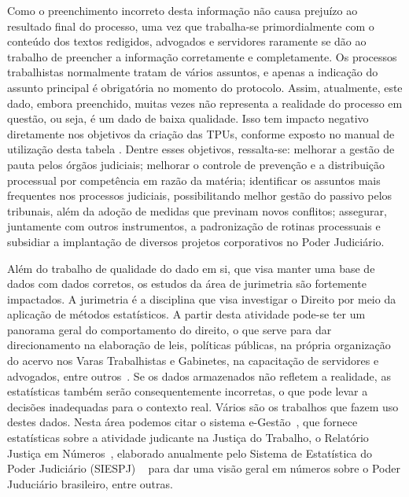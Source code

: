 Como o preenchimento incorreto desta informação não causa prejuízo ao resultado final do processo, uma vez que trabalha-se primordialmente com o conteúdo dos textos redigidos, advogados e servidores raramente se dão ao trabalho de preencher a informação corretamente e completamente. Os processos trabalhistas normalmente tratam de vários assuntos, e apenas a indicação do assunto principal é obrigatória no momento do protocolo. Assim, atualmente, este dado, embora preenchido, muitas vezes não representa a realidade do processo em questão, ou seja, é um dado de baixa qualidade. Isso tem impacto negativo diretamente nos objetivos da criação das TPUs, conforme exposto no manual de utilização desta tabela \cite{manualtpucnj}. Dentre esses objetivos, ressalta-se: melhorar a gestão de pauta pelos órgãos judiciais; melhorar o controle de prevenção e a distribuição processual por competência em razão da matéria; identificar os assuntos mais frequentes nos processos judiciais, possibilitando melhor gestão do passivo pelos tribunais, além da adoção de medidas que previnam novos conflitos; assegurar, juntamente com outros instrumentos, a padronização de rotinas processuais e subsidiar a implantação de diversos projetos corporativos no Poder Judiciário.

Além do trabalho de qualidade do dado em si, que visa manter uma base de dados com dados corretos, os estudos da área de jurimetria são fortemente impactados. A jurimetria é a disciplina que visa investigar o Direito por meio da aplicação de métodos estatísticos. 
A partir desta atividade pode-se ter um panorama geral do comportamento do direito, o que serve para dar direcionamento na elaboração de leis, políticas públicas, na própria organização do acervo nos Varas Trabalhistas e Gabinetes, na capacitação de servidores e advogados, entre outros~\cite{jurimetriaingles,jurimetriaportugues}. Se os dados armazenados não refletem a realidade, as estatísticas também serão consequentemente incorretas, o que pode levar a decisões inadequadas para o contexto real. Vários são os trabalhos que fazem uso destes dados. Nesta área podemos citar o sistema e-Gestão~\cite{leiegestao}, que fornece estatísticas sobre a atividade judicante na Justiça do Trabalho,  o Relatório Justiça em Números~\cite{leijusticaemnumeros}, elaborado anualmente pelo Sistema de Estatística do Poder Judiciário (SIESPJ) ~\cite{leisiespj} para dar uma visão geral em números sobre o Poder Juduciário brasileiro, entre outras.

